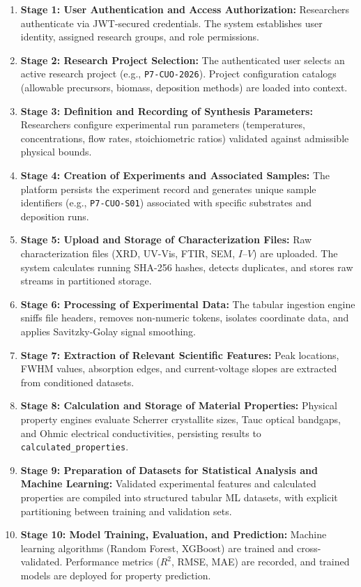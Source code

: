 \documentclass[12pt,a4paper,oneside]{report}
\begin{document}
{{{\begin{enumerate}
    \item \textbf{Stage 1: User Authentication and Access Authorization:} Researchers authenticate via JWT-secured credentials. The system establishes user identity, assigned research groups, and role permissions.
    \item \textbf{Stage 2: Research Project Selection:} The authenticated user selects an active research project (e.g., \texttt{P7-CUO-}\allowbreak\texttt{2026}). Project configuration catalogs (allowable precursors, biomass, deposition methods) are loaded into context.
    \item \textbf{Stage 3: Definition and Recording of Synthesis Parameters:} Researchers configure experimental run parameters (temperatures, concentrations, flow rates, stoichiometric ratios) validated against admissible physical bounds.
    \item \textbf{Stage 4: Creation of Experiments and Associated Samples:} The platform persists the experiment record and generates unique sample identifiers (e.g., \texttt{P7-CUO-S01}) associated with specific substrates and deposition runs.
    \item \textbf{Stage 5: Upload and Storage of Characterization Files:} Raw characterization files (XRD, UV-Vis, FTIR, SEM, $I\text{--}V$) are uploaded. The system calculates running SHA-256 hashes, detects duplicates, and stores raw streams in partitioned storage.
    \item \textbf{Stage 6: Processing of Experimental Data:} The tabular ingestion engine sniffs file headers, removes non-numeric tokens, isolates coordinate data, and applies Savitzky-Golay signal smoothing.
    \item \textbf{Stage 7: Extraction of Relevant Scientific Features:} Peak locations, FWHM values, absorption edges, and current-voltage slopes are extracted from conditioned datasets.
    \item \textbf{Stage 8: Calculation and Storage of Material Properties:} Physical property engines evaluate Scherrer crystallite sizes, Tauc optical bandgaps, and Ohmic electrical conductivities, persisting results to \texttt{calculated\_properties}.
    \item \textbf{Stage 9: Preparation of Datasets for Statistical Analysis and Machine Learning:} Validated experimental features and calculated properties are compiled into structured tabular ML datasets, with explicit partitioning between training and validation sets.
    \item \textbf{Stage 10: Model Training, Evaluation, and Prediction:} Machine learning algorithms (Random Forest, XGBoost) are trained and cross-validated. Performance metrics ($R^2$, RMSE, MAE) are recorded, and trained models are deployed for property prediction.

\end{enumerate}}}}
\end{document}
